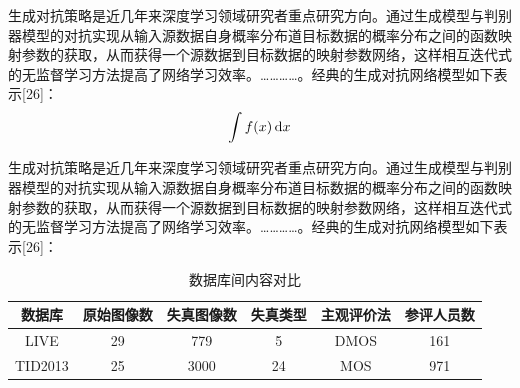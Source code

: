 生成对抗策略是近几年来深度学习领域研究者重点研究方向。通过生成模型与判别器模型的对抗实现从输入源数据自身概率分布道目标数据的概率分布之间的函数映射参数的获取，从而获得一个源数据到目标数据的映射参数网络，这样相互迭代式的无监督学习方法提高了网络学习效率。…………。经典的生成对抗网络模型如下表示[26]：
\begin{equation}
    \int f(x) \mathop{}\!\mathrm{d} x
\end{equation}

生成对抗策略是近几年来深度学习领域研究者重点研究方向。通过生成模型与判别器模型的对抗实现从输入源数据自身概率分布道目标数据的概率分布之间的函数映射参数的获取，从而获得一个源数据到目标数据的映射参数网络，这样相互迭代式的无监督学习方法提高了网络学习效率。…………。经典的生成对抗网络模型如下表示[26]：




\begin{table}[h]
    \centering
    \caption{数据库间内容对比 }
    \begin{tabular}{cccccc}
      \toprule
      数据库  & 原始图像数 & 失真图像数 & 失真类型 & 主观评价法 & 参评人员数 \\
      \midrule
      LIVE    & 29         & 779        & 5       & DMOS       & 161        \\
      TID2013 & 25         & 3000       & 24      & MOS        & 971        \\
      \bottomrule
    \end{tabular}
    \label{tab:three-line}
  \end{table}